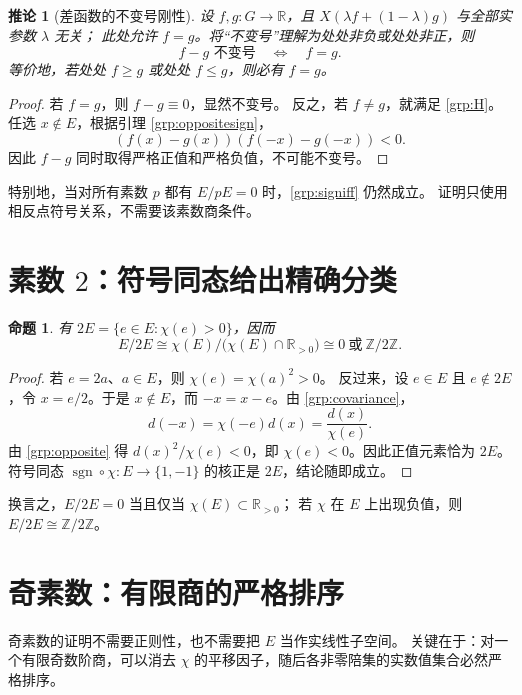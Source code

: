 \documentclass[11pt,a4paper,oneside,openany]{book}
\theoremstyle{lecture}
\newtheorem{proposition}[theorem]{命题}
\newtheorem{corollary}[theorem]{推论}
\newcommand{\R}{\mathbb R}
\newcommand{\Z}{\mathbb Z}
\newcommand{\sgn}{\operatorname{sgn}}
\numberwithin{equation}{section}
\begin{document}
\begin{corollary}[差函数的不变号刚性]\label{grp:signrigidity}
设 $f,g:G\to\R$，且
$X(\lambda f+(1-\lambda)g)$ 与全部实参数 $\lambda$ 无关；
此处允许 $f=g$。将“不变号”理解为处处非负或处处非正，则
\begin{equation}\label{grp:signiff}
 \boxed{\quad f-g\text{ 不变号}\quad\Longleftrightarrow\quad f=g.\quad}
\end{equation}
等价地，若处处 $f\ge g$ 或处处 $f\le g$，则必有 $f=g$。
\end{corollary}

\begin{proof}
若 $f=g$，则 $f-g\equiv0$，显然不变号。
反之，若 $f\ne g$，就满足 \eqref{grp:H}。
任选 $x\notin E$，根据引理 \ref{grp:oppositesign}，
\[
 (f(x)-g(x))(f(-x)-g(-x))<0.
\]
因此 $f-g$ 同时取得严格正值和严格负值，不可能不变号。
\end{proof}

特别地，当对所有素数 $p$ 都有 $E/pE=0$ 时，\eqref{grp:signiff} 仍然成立。
证明只使用相反点符号关系，不需要该素数商条件。

\section{素数 \texorpdfstring{$2$}{2}：符号同态给出精确分类}

\begin{proposition}\label{grp:two}
有 $2E=\{e\in E:\chi(e)>0\}$，因而
\[
 E/2E\cong\chi(E)\big/\bigl(\chi(E)\cap\R_{>0}\bigr)
 \cong0\ \text{或}\ \Z/2\Z.
\]
\end{proposition}

\begin{proof}
若 $e=2a$、$a\in E$，则 $\chi(e)=\chi(a)^2>0$。
反过来，设 $e\in E$ 且 $e\notin2E$，令 $x=e/2$。于是 $x\notin E$，而
$-x=x-e$。由 \eqref{grp:covariance}，
\[
 d(-x)=\chi(-e)d(x)=\frac{d(x)}{\chi(e)}.
\]
由 \eqref{grp:opposite} 得
$d(x)^2/\chi(e)<0$，即 $\chi(e)<0$。因此正值元素恰为 $2E$。
符号同态 $\sgn\circ\chi:E\to\{1,-1\}$ 的核正是 $2E$，结论随即成立。
\end{proof}

换言之，$E/2E=0$ 当且仅当 $\chi(E)\subset\R_{>0}$；
若 $\chi$ 在 $E$ 上出现负值，则 $E/2E\cong\Z/2\Z$。

\section{奇素数：有限商的严格排序}

奇素数的证明不需要正则性，也不需要把 $E$ 当作实线性子空间。
关键在于：对一个有限奇数阶商，可以消去 $\chi$ 的平移因子，随后各非零陪集的实数值集合必然严格排序。
\end{document}
